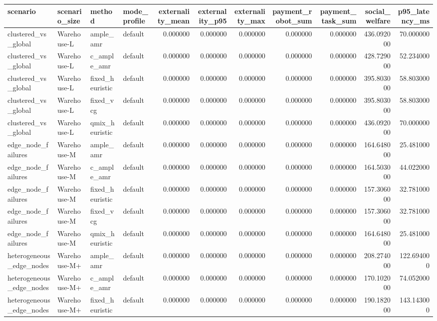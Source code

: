 \begin{tabular}{llllrrrrrrr}
\toprule
scenario & scenario_size & method & mode_profile & externality_mean & externality_p95 & externality_max & payment_robot_sum & payment_task_sum & social_welfare & p95_latency_ms \\
\midrule
clustered_vs_global & Warehouse-L & ample_amr & default & 0.000000 & 0.000000 & 0.000000 & 0.000000 & 0.000000 & 436.092000 & 70.000000 \\
clustered_vs_global & Warehouse-L & c_ample_amr & default & 0.000000 & 0.000000 & 0.000000 & 0.000000 & 0.000000 & 428.729000 & 52.234000 \\
clustered_vs_global & Warehouse-L & fixed_heuristic & default & 0.000000 & 0.000000 & 0.000000 & 0.000000 & 0.000000 & 395.803000 & 58.803000 \\
clustered_vs_global & Warehouse-L & fixed_vcg & default & 0.000000 & 0.000000 & 0.000000 & 0.000000 & 0.000000 & 395.803000 & 58.803000 \\
clustered_vs_global & Warehouse-L & qmix_heuristic & default & 0.000000 & 0.000000 & 0.000000 & 0.000000 & 0.000000 & 436.092000 & 70.000000 \\
edge_node_failures & Warehouse-M & ample_amr & default & 0.000000 & 0.000000 & 0.000000 & 0.000000 & 0.000000 & 164.648000 & 25.481000 \\
edge_node_failures & Warehouse-M & c_ample_amr & default & 0.000000 & 0.000000 & 0.000000 & 0.000000 & 0.000000 & 164.503000 & 44.022000 \\
edge_node_failures & Warehouse-M & fixed_heuristic & default & 0.000000 & 0.000000 & 0.000000 & 0.000000 & 0.000000 & 157.306000 & 32.781000 \\
edge_node_failures & Warehouse-M & fixed_vcg & default & 0.000000 & 0.000000 & 0.000000 & 0.000000 & 0.000000 & 157.306000 & 32.781000 \\
edge_node_failures & Warehouse-M & qmix_heuristic & default & 0.000000 & 0.000000 & 0.000000 & 0.000000 & 0.000000 & 164.648000 & 25.481000 \\
heterogeneous_edge_nodes & Warehouse-M+ & ample_amr & default & 0.000000 & 0.000000 & 0.000000 & 0.000000 & 0.000000 & 208.274000 & 122.694000 \\
heterogeneous_edge_nodes & Warehouse-M+ & c_ample_amr & default & 0.000000 & 0.000000 & 0.000000 & 0.000000 & 0.000000 & 170.102000 & 74.052000 \\
heterogeneous_edge_nodes & Warehouse-M+ & fixed_heuristic & default & 0.000000 & 0.000000 & 0.000000 & 0.000000 & 0.000000 & 190.182000 & 143.143000 \\

\end{tabular}

